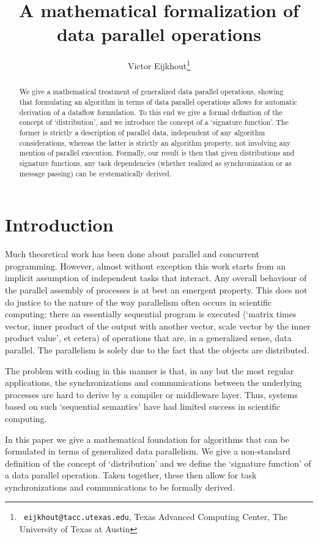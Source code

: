 \documentclass[11pt,fleqn,preprint]{impreport}
\title[Halo math]{A mathematical formalization of data parallel operations}
\author[Eijkhout]{Victor Eijkhout\thanks{{\tt
      eijkhout@tacc.utexas.edu}, Texas Advanced Computing Center, The
    University of Texas at Austin}}
\begin{document}
\maketitle

\begin{abstract}
  We give a mathematical treatment of generalized data parallel
  operations,
  showing that formulating an algorithm in terms of data
  parallel operations allows for automatic derivation of a dataflow
  formulation.
  To this end we give a formal definition of the concept of
  `distribution', and we introduce the concept of a `signature
  function'.
  The former is strictly a description of parallel data, independent
  of any algorithm considerations, whereas the latter is strictly an
  algorithm property, not involving any mention of parallel execution.
  Formally, our result is then that given distributions and signature
  functions, any task dependencies (whether realized as
  synchronization or as message passing) can be systematically derived.
\end{abstract}

\acresetall

\section{Introduction}

Much theoretical work has been done about parallel and concurrent
programming. However, almost without exception this work starts from
an implicit assumption of independent tasks that interact. Any overall
behaviour of the parallel assembly of processes is at best an emergent
property. This does not do justice to the nature of the way parallelism
often occurs in scientific computing: there an essentially sequential
program is executed (`matrix times vector, inner product of the output
with another vector, scale vector by the inner product value', et
cetera) of operations that are, in a generalized sense, data parallel.
The parallelism is solely due to the fact that the objects
are distributed. 

The problem with coding in this manner is that, in any but the most
regular applications, the synchronizations and communications between
the underlying processes are hard to derive by a compiler or
middleware layer. Thus, systems based on such `sequential semantics'
have had limited success in scientific computing.

In this paper we give a mathematical foundation for algorithms that
can be formulated in terms of generalized data parallelism. We give a
non-standard definition of the concept of `distribution' and we define
the `signature function' of a data parallel operation. Taken together,
these then allow for task synchronizations and communications to be
formally derived. 
\end{document}
